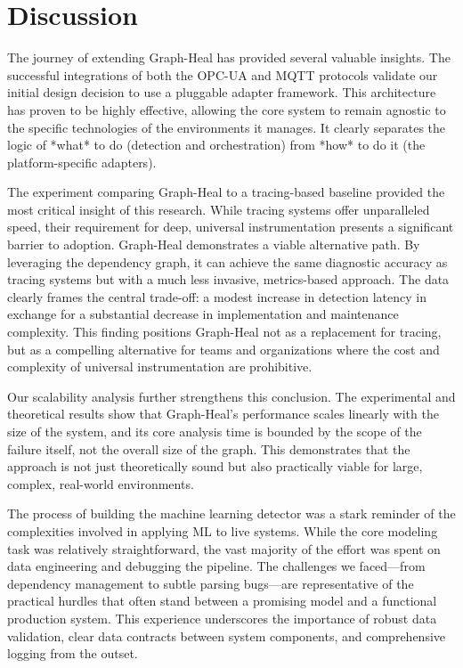 \documentclass[11pt,conference]{IEEEtran}
\begin{document}
\section{Discussion}
\label{sec:discussion}
The journey of extending Graph-Heal has provided several valuable insights. The successful integrations of both the OPC-UA and MQTT protocols validate our initial design decision to use a pluggable adapter framework. This architecture has proven to be highly effective, allowing the core system to remain agnostic to the specific technologies of the environments it manages. It clearly separates the logic of *what* to do (detection and orchestration) from *how* to do it (the platform-specific adapters).

The experiment comparing Graph-Heal to a tracing-based baseline provided the most critical insight of this research. While tracing systems offer unparalleled speed, their requirement for deep, universal instrumentation presents a significant barrier to adoption. Graph-Heal demonstrates a viable alternative path. By leveraging the dependency graph, it can achieve the same diagnostic accuracy as tracing systems but with a much less invasive, metrics-based approach. The data clearly frames the central trade-off: a modest increase in detection latency in exchange for a substantial decrease in implementation and maintenance complexity. This finding positions Graph-Heal not as a replacement for tracing, but as a compelling alternative for teams and organizations where the cost and complexity of universal instrumentation are prohibitive.

Our scalability analysis further strengthens this conclusion. The experimental and theoretical results show that Graph-Heal's performance scales linearly with the size of the system, and its core analysis time is bounded by the scope of the failure itself, not the overall size of the graph. This demonstrates that the approach is not just theoretically sound but also practically viable for large, complex, real-world environments.

The process of building the machine learning detector was a stark reminder of the complexities involved in applying ML to live systems. While the core modeling task was relatively straightforward, the vast majority of the effort was spent on data engineering and debugging the pipeline. The challenges we faced—from dependency management to subtle parsing bugs—are representative of the practical hurdles that often stand between a promising model and a functional production system. This experience underscores the importance of robust data validation, clear data contracts between system components, and comprehensive logging from the outset.
\end{document}
